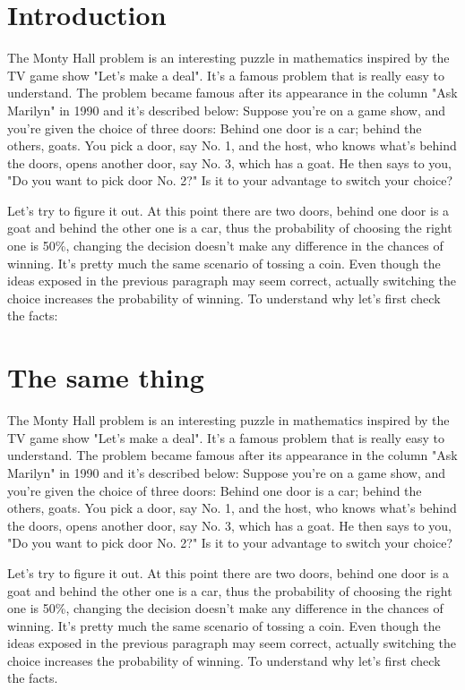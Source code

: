 \documentclass{oscmjournal}
\begin{document}
\section{Introduction}

The Monty Hall problem is an interesting puzzle in mathematics inspired by the TV  game show "Let's make a deal". It's a famous problem that is really easy to understand. The problem became famous after its appearance in the column "Ask Marilyn" in 1990 and  it's described below: Suppose you're on a game show, and you're given the choice of three doors: Behind one  door is a car; behind the others, goats. You pick a door, say No. 1, and the host, who  knows what's behind the doors, opens another door, say No. 3, which has a goat. He then  says to you, "Do you want to pick door No. 2?" Is it to your advantage to switch your choice?


Let's try to figure it out. At this point there are two doors, behind one door is a goat  and behind the other one is a car, thus the probability of choosing the right one is 50\%, changing the decision doesn't make any difference in the chances of winning. It's pretty much the same scenario of tossing a coin. Even though the ideas exposed in the previous paragraph may seem correct, actually switching the choice increases the probability of winning. To understand why let's  first check the facts:

\section{The same thing}

The Monty Hall problem is an interesting puzzle in mathematics inspired by the TV  game show "Let's make a deal". It's a famous problem that is really easy to understand. The problem became famous after its appearance in the column "Ask Marilyn" in 1990 and  it's described below: Suppose you're on a game show, and you're given the choice of three doors: Behind one  door is a car; behind the others, goats. You pick a door, say No. 1, and the host, who  knows what's behind the doors, opens another door, say No. 3, which has a goat. He then  says to you, "Do you want to pick door No. 2?" Is it to your advantage to switch your choice?

Let's try to figure it out. At this point there are two doors, behind one door is a goat  and behind the other one is a car, thus the probability of choosing the right one is 50\%, changing the decision doesn't make any difference in the chances of winning. It's pretty much the same scenario of tossing a coin. Even though the ideas exposed in the previous paragraph may seem correct, actually switching the choice increases the probability of winning. To understand why let's  first check the facts.
\end{document}
